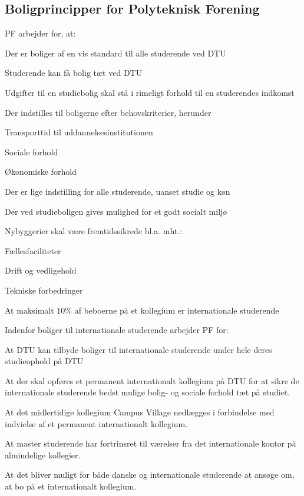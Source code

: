 \subsection{Boligprincipper for Polyteknisk Forening}
PF arbejder for, at:
\begin{list}{•}
\item Der er boliger af en vis standard til alle studerende ved DTU
\item Studerende kan få bolig tæt ved DTU
\item Udgifter til en studiebolig skal stå i rimeligt forhold til en studerendes indkomst
\item Der indstilles til boligerne efter behovskriterier, herunder
	\begin{list}{•}
	\item Transporttid til uddannelsesinstitutionen
	\item Sociale forhold
	\item Økonomiske forhold
	\end{list}
\item Der er lige indstilling for alle studerende, uanset studie og køn
\item Der ved studieboligen gives mulighed for et godt socialt miljø
\item Nybyggerier skal være fremtidssikrede bl.a. mht.:
	\begin{list}{•}
\item  Fællesfaciliteter
\item Drift og vedligehold
\item Tekniske forbedringer
	\end{list}
\item At maksimalt $10\%$ af beboerne på et kollegium er internationale studerende
\end{list}
Indenfor boliger til internationale studerende arbejder PF for:
\begin{list}{•}
\item At DTU kan tilbyde boliger til internationale studerende under hele deres studieophold på DTU
\item At der skal opføres et permanent internationalt kollegium på DTU for at sikre de internationale studerende
bedst mulige bolig- og sociale forhold tæt på studiet.
\item At det midlertidige kollegium Campus Village nedlægges i forbindelse med indvielse af et permanent
internationalt kollegium.
\item At master studerende har fortrinsret til værelser fra det internationale kontor på almindelige kollegier.
\item At det bliver muligt for både danske og internationale studerende at ansøge om, at bo på et internationalt
kollegium.
\end{list}
